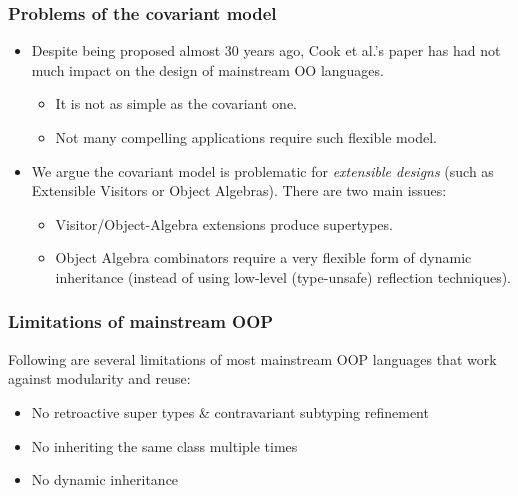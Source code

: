 \documentclass{beamer}
\begin{document}
\begin{frame}
  \frametitle{Problems of the covariant model}

  \begin{itemize}
  \item Despite being proposed almost 30 years ago, Cook et al.'s paper has had not
    much impact on the design of mainstream OO languages.
    \begin{itemize}
    \item It is not as simple as the covariant one.
    \item Not many compelling applications require such flexible model.
    \end{itemize}
\pause

  \item We argue the covariant model is problematic for \textit{extensible
      designs} (such as Extensible Visitors or Object Algebras). There are two
    main issues:
    \begin{itemize}
    \item Visitor/Object-Algebra extensions produce supertypes.
    \item Object Algebra combinators require a very flexible form of dynamic
      inheritance (instead of using low-level (type-unsafe) reflection
      techniques).
    \end{itemize}


  \end{itemize}

\end{frame}


\begin{frame}[fragile]
  \frametitle{Limitations of mainstream OOP}

  Following are several limitations of most mainstream OOP languages that work
  against modularity and reuse:

  \begin{alertblock}{}
  \begin{itemize}
  \item No retroactive super types \& contravariant subtyping refinement
  \item No inheriting the same class multiple times
  \item No dynamic inheritance
  \end{itemize}


  \end{alertblock}


\end{frame}
\end{document}
